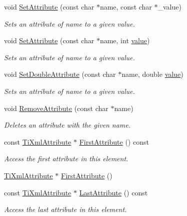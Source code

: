 \begin{DoxyCompactItemize}
void \hyperlink{class_ti_xml_element_abf0b3bd7f0e4c746a89ec6e7f101fc32}{SetAttribute} (const char $\ast$name, const char $\ast$\_\-value)
\begin{DoxyCompactList}\small\item\em Sets an attribute of name to a given value. \end{DoxyCompactList}\item 
void \hyperlink{class_ti_xml_element_ace6f4be75e373726d4774073d666d1a7}{SetAttribute} (const char $\ast$name, int \hyperlink{class_ti_xml_node_ab068eb0e3311ba1b5a132abe60a9c3c8}{value})
\begin{DoxyCompactList}\small\item\em Sets an attribute of name to a given value. \end{DoxyCompactList}\item 
void \hyperlink{class_ti_xml_element_a0d1dd975d75496778177e35abfe0ec0b}{SetDoubleAttribute} (const char $\ast$name, double \hyperlink{class_ti_xml_node_ab068eb0e3311ba1b5a132abe60a9c3c8}{value})
\begin{DoxyCompactList}\small\item\em Sets an attribute of name to a given value. \end{DoxyCompactList}\item 
void \hyperlink{class_ti_xml_element_a56979767deca794376b1dfa69a525b2a}{RemoveAttribute} (const char $\ast$name)
\begin{DoxyCompactList}\small\item\em Deletes an attribute with the given name. \end{DoxyCompactList}\item 
const \hyperlink{class_ti_xml_attribute}{TiXmlAttribute} $\ast$ \hyperlink{class_ti_xml_element_a516054c9073647d6cb29b6abe9fa0592}{FirstAttribute} () const 
\begin{DoxyCompactList}\small\item\em Access the first attribute in this element. \end{DoxyCompactList}\item 
\hyperlink{class_ti_xml_attribute}{TiXmlAttribute} $\ast$ \hyperlink{class_ti_xml_element_a4b33780fc565d38d6b54f640e0cf1737}{FirstAttribute} ()
\item 
const \hyperlink{class_ti_xml_attribute}{TiXmlAttribute} $\ast$ \hyperlink{class_ti_xml_element_a86191b49f9177be132b85b14655f1381}{LastAttribute} () const 
\begin{DoxyCompactList}\small\item\em Access the last attribute in this element. \end{DoxyCompactList}\item 

\end{DoxyCompactItemize}
